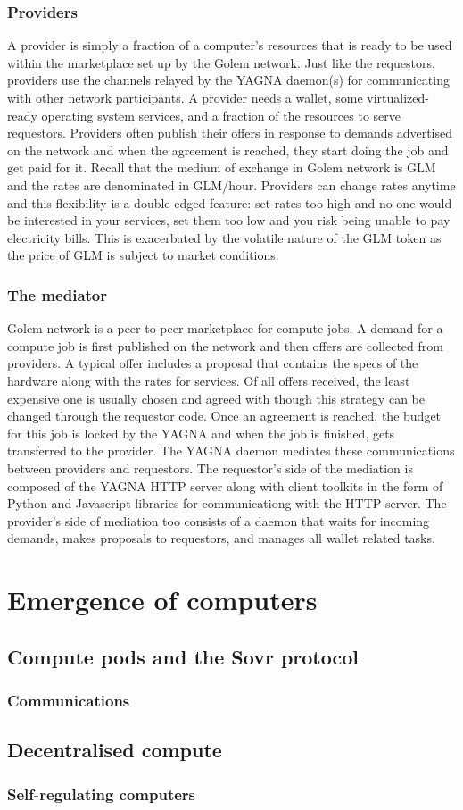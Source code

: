 \documentclass[a4paper, 10pt]{article}
\begin{document}
\subsubsection*{Providers}
A provider is simply a fraction of a computer's resources that is ready to be used within the marketplace set up by the Golem network. Just like the requestors, providers use the channels relayed by the YAGNA daemon(s) for communicating with other network participants. A provider needs a wallet, some virtualized-ready operating system services, and a fraction of the resources to serve requestors. Providers often publish their offers in response to demands advertised on the network and when the agreement is reached, they start doing the job and get paid for it. Recall that the medium of exchange in Golem network is GLM and the rates are denominated in GLM/hour. Providers can change rates anytime and this flexibility is a double-edged feature: set rates too high and no one would be interested in your services, set them too low and you risk being unable to pay electricity bills. This is exacerbated by the volatile nature of the GLM token as the price of GLM is subject to market conditions. 
\subsubsection*{The mediator}
Golem network is a peer-to-peer marketplace for compute jobs. A demand for a compute job is first published on the network and then offers are collected from providers. A typical offer includes a proposal that contains the specs of the hardware along with the rates for services. Of all offers received, the least expensive one is usually chosen and agreed with though this strategy can be changed through the requestor code. Once an agreement is reached, the budget for this job is locked by the YAGNA and when the job is finished, gets transferred to the provider. The YAGNA daemon mediates these communications between providers and requestors. The requestor's side of the mediation is composed of the YAGNA HTTP server along with client toolkits in the form of Python and Javascript libraries for communicationg with the HTTP server. The provider's side of mediation too consists of a daemon that waits for incoming demands, makes proposals to requestors, and manages all wallet related tasks.

\section{Emergence of computers}

\subsection{Compute pods and the Sovr protocol}

\subsubsection*{Communications}

\subsection{Decentralised compute}

\subsubsection*{Self-regulating computers}
\end{document}

